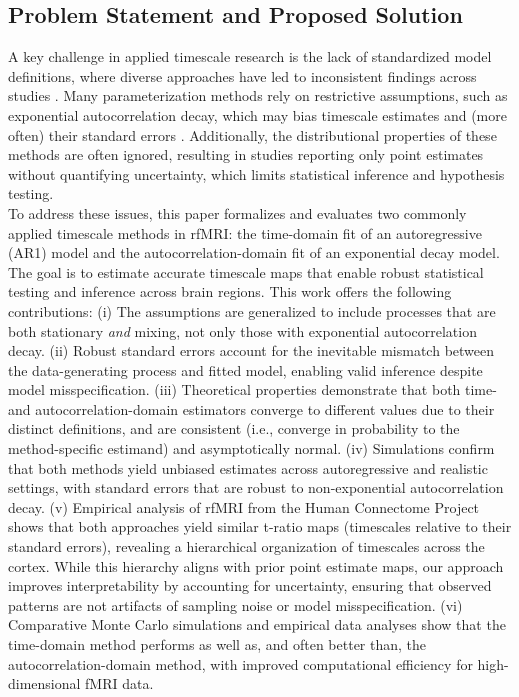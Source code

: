 \documentclass[9pt]{article}
\begin{document}
\subsection{Problem Statement and Proposed Solution}
A key challenge in applied timescale research is the lack of standardized model definitions, where diverse approaches have led to inconsistent findings across studies \citep{zeraati_flexible_2022, fallon_timescales_2020, shafiei_topographic_2020}. Many parameterization methods rely on restrictive assumptions, such as exponential autocorrelation decay, which may bias timescale estimates and (more often) their standard errors \citep{woolrich_temporal_2001, zeraati_flexible_2022, raut_time_2019}. Additionally, the distributional properties of these methods are often ignored, resulting in studies reporting only point estimates without quantifying uncertainty, which limits statistical inference and hypothesis testing.\\

To address these issues, this paper formalizes and evaluates two commonly applied timescale methods in rfMRI: the time-domain fit of an autoregressive (AR1) model and the autocorrelation-domain fit of an exponential decay model. The goal is to estimate accurate timescale maps that enable robust statistical testing and inference across brain regions. This work offers the following contributions: (i) The assumptions are generalized to include processes that are both stationary \emph{and} mixing, not only those with exponential autocorrelation decay. (ii) Robust standard errors account for the inevitable mismatch between the data-generating process and fitted model, enabling valid inference despite model misspecification. (iii) Theoretical properties demonstrate that both time- and autocorrelation-domain estimators converge to different values due to their distinct definitions, and are consistent (i.e., converge in probability to the method-specific estimand) and asymptotically normal. (iv) Simulations confirm that both methods yield unbiased estimates across autoregressive and realistic settings, with standard errors that are robust to non-exponential autocorrelation decay. (v) Empirical analysis of rfMRI from the Human Connectome Project shows that both approaches yield similar t-ratio maps (timescales relative to their standard errors), revealing a hierarchical organization of timescales across the cortex. While this hierarchy aligns with prior point estimate maps, our approach improves interpretability by accounting for uncertainty, ensuring that observed patterns are not artifacts of sampling noise or model misspecification. (vi) Comparative Monte Carlo simulations and empirical data analyses show that the time-domain method performs as well as, and often better than, the autocorrelation-domain method, with improved computational efficiency for high-dimensional fMRI data.\\
\end{document}
